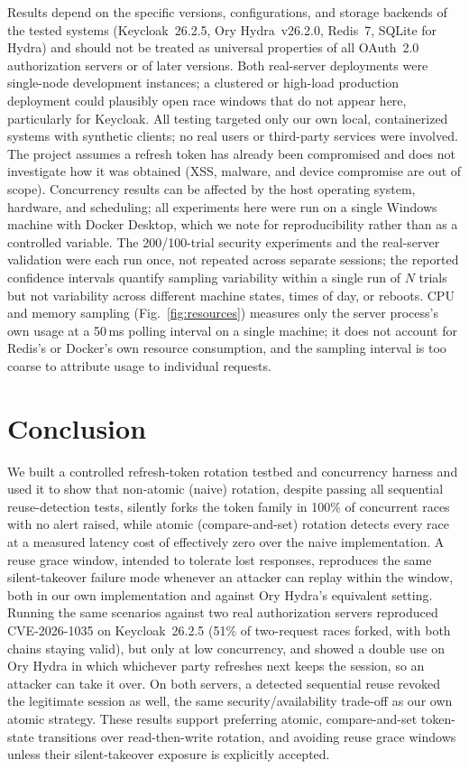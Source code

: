 \documentclass[conference]{IEEEtran}
\begin{document}
Results depend on the specific versions, configurations, and storage
backends of the tested systems (Keycloak~26.2.5, Ory Hydra~v26.2.0,
Redis~7, SQLite for Hydra) and should not be treated as universal
properties of all OAuth~2.0 authorization servers or of later versions.
Both real-server deployments were single-node development instances; a
clustered or high-load production deployment could plausibly open race
windows that do not appear here, particularly for Keycloak. All testing
targeted only our own local, containerized systems with synthetic
clients; no real users or third-party services were involved. The project
assumes a refresh token has already been compromised and does not
investigate how it was obtained (XSS, malware, and device compromise are
out of scope). Concurrency results can be affected by the host operating
system, hardware, and scheduling; all experiments here were run on a
single Windows machine with Docker Desktop, which we note for
reproducibility rather than as a controlled variable. The 200/100-trial
security experiments and the real-server validation were each run once,
not repeated across separate sessions; the reported confidence intervals
quantify sampling variability within a single run of $N$ trials but not
variability across different machine states, times of day, or reboots.
CPU and memory sampling (Fig.~\ref{fig:resources}) measures only the
server process's own usage at a 50\,ms polling interval on a single
machine; it does not account for Redis's or Docker's own resource
consumption, and the sampling interval is too coarse to attribute usage
to individual requests.

\section{Conclusion}

We built a controlled refresh-token rotation testbed and concurrency
harness and used it to show that non-atomic (naive) rotation, despite
passing all sequential reuse-detection tests, silently forks the token
family in 100\% of concurrent races with no alert raised, while atomic
(compare-and-set) rotation detects every race at a measured latency cost
of effectively zero over the naive implementation. A reuse grace window,
intended to tolerate lost responses, reproduces the same silent-takeover
failure mode whenever an attacker can replay within the window, both in
our own implementation and against Ory Hydra's equivalent setting.
Running the same scenarios against two real authorization servers
reproduced CVE-2026-1035 on Keycloak~26.2.5 (51\% of two-request races
forked, with both chains staying valid), but only at low concurrency, and
showed a double use on Ory Hydra in which whichever party refreshes next
keeps the session, so an attacker can take it over. On both servers, a detected
sequential reuse revoked the legitimate session as well, the same
security/availability trade-off as our own atomic strategy. These
results support preferring atomic, compare-and-set token-state transitions
over read-then-write rotation, and avoiding reuse grace windows unless
their silent-takeover exposure is explicitly accepted.
\end{document}
